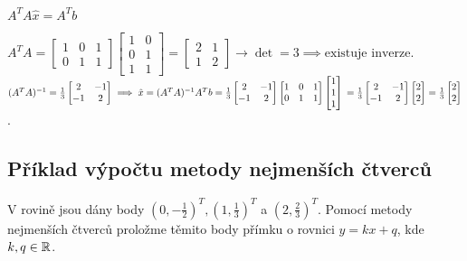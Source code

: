 $A^T A \hat x = A^T b$

$A^T A = 
\begin{bmatrix}
    1 & 0 & 1 \\
    0 & 1 & 1
\end{bmatrix}
\begin{bmatrix}
    1 & 0 \\
    0 & 1 \\
    1 & 1
\end{bmatrix}
=
\begin{bmatrix}
    2 & 1 \\
    1 & 2 
\end{bmatrix} 
\rightarrow \det = 3 \implies \text{existuje inverze.}$
\\

$(A^T A)^{-1} = \frac{1}{3}
\begin{bmatrix}
    2 & -1 \\
    -1 & 2 
\end{bmatrix} \implies \hat x = (A^T A)^{-1}A^T b = \frac{1}{3}
\begin{bmatrix}
    2 & -1 \\
    -1 & 2 
\end{bmatrix}
\begin{bmatrix}
    1 & 0 & 1 \\
    0 & 1 & 1
\end{bmatrix}
\begin{bmatrix}
    1 \\
    1 \\
    1 
\end{bmatrix}\\ 
= \frac{1}{3}
\begin{bmatrix}
    2 & -1 \\
    -1 & 2 
\end{bmatrix}
\begin{bmatrix}
    2 \\
    2 
\end{bmatrix} = \frac{1}{3}
\begin{bmatrix}
    2 \\
    2 
\end{bmatrix}$.

\subsection{Příklad výpočtu metody nejmenších čtverců}
V rovině jsou dány body $(0, -\frac{1}{2})^T, (1, \frac{1}{3})^T$ a $(2, \frac{2}{3})^T$. Pomocí metody nejmenších 
čtverců proložme těmito body přímku o rovnici $y = kx + q$, kde $k ,q \in \mathbb{R}$.

